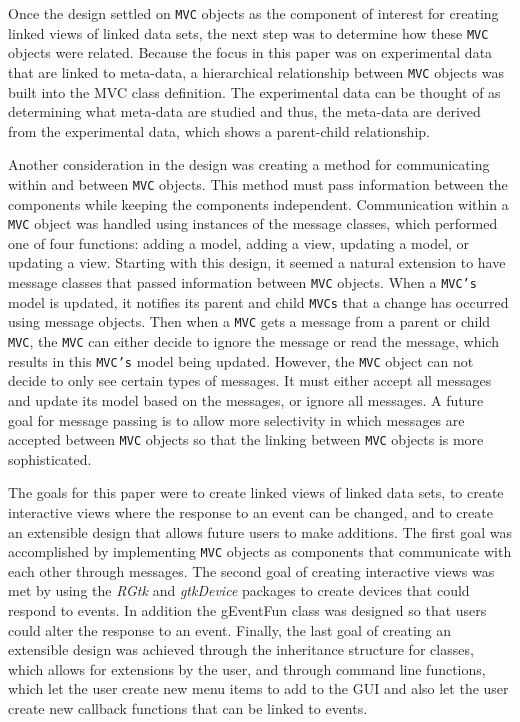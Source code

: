 \documentclass{article}[11pt]
\newcommand{\Robject}[1]{{\texttt{#1}}}
\newcommand{\Rpackage}[1]{{\textit{#1}}}
\newcommand{\Rclass}[1]{\textsf{#1}}
\begin{document}
Once the design settled on \Robject{MVC} objects as the component of interest
for creating linked views of linked data sets, the next step was to determine
how these \Robject{MVC} objects were related.  Because the focus in this paper
was on experimental data that are linked to meta-data, a hierarchical
relationship between \Robject{MVC} objects was built into the \Rclass{MVC}
class definition.  The experimental data can be thought of as determining what
meta-data are studied and thus, the meta-data are derived from the
experimental data, which shows a parent-child relationship.  
 
Another consideration in the design was creating a method for communicating
within and between \Robject{MVC} objects.  This method must pass information
between the components while keeping the components independent.
Communication within a \Robject{MVC} object was handled using instances of the
message classes, which performed one of four functions: adding a model, adding
a view, updating a model, or updating a view.  Starting with this design, it
seemed a natural extension to have message classes that passed information
between \Robject{MVC} objects.  When a \Robject{MVC's} model is updated, it
notifies its parent and child \Robject{MVCs} that a change has occurred using
message objects.  Then when a \Robject{MVC} gets a message from a parent or
child \Robject{MVC}, the \Robject{MVC} can either decide to ignore the message
or read the message, which results in this \Robject{MVC's} model being
updated.  However, the \Robject{MVC} object can not decide to only see certain
types of messages.  It must either accept all messages and update its model
based on the messages, or ignore all messages.  A future goal for message
passing is to allow more selectivity in which messages are accepted between
\Robject{MVC} objects so that the linking between \Robject{MVC} objects is
more sophisticated. 

The goals for this paper were to create linked views of linked data sets, to
create interactive views where the response to an event can be changed, and to
create an extensible design that allows future users to make additions.
The first goal was accomplished by implementing \Robject{MVC} objects as
components that communicate with each other through messages.  The second goal
of creating interactive views was met by using the \Rpackage{RGtk} and
\Rpackage{gtkDevice} packages to create devices that could respond to events.
In addition the \Rclass{gEventFun} class was designed so that users could
alter the response to an event.  Finally, the last goal of creating an
extensible design was achieved through the inheritance structure for classes,
which allows for extensions by the user, and through command line functions,
which let the user create new menu items to add to the GUI and also let the
user create new callback functions that can be linked to events. 
\end{document}
